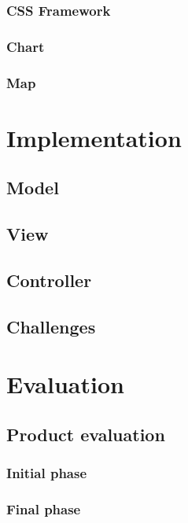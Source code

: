 \documentclass{l4proj}
\begin{document}
\subsection{CSS Framework}

\subsection{Chart}

\subsection{Map}



\chapter{Implementation}

\section{Model}

\section{View}

\section{Controller}

\section{Challenges}

\chapter{Evaluation}

\section{Product evaluation}

\subsection{Initial phase}

\subsection{Final phase}
\end{document}

